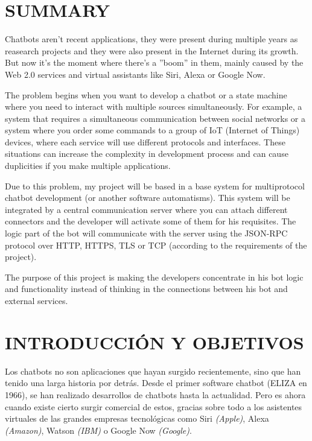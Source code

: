 \documentclass[spanish,12pt, a4paper, twoside]{paper}
\let\oldsection\section
\def\section{\cleardoublepage\oldsection}
\begin{document}
\section*{SUMMARY}
Chatbots aren't recent applications, they were present during multiple years as reasearch projects and they were also present in the Internet during its growth. But now it's the moment where there's a ''boom'' in them, mainly caused by the Web 2.0 services and virtual assistants like Siri, Alexa or Google Now.
\newline

The problem begins when you want to develop a chatbot or a state machine where you need to interact with multiple sources simultaneously. For example, a system that requires a simultaneous communication between social networks or a system where you order some commands to a group of IoT (Internet of Things) devices, where each service will use different protocols and interfaces. These situations can increase the complexity in development process and can cause duplicities if you make multiple applications. 
\newline

Due to this problem, my project will be based in a base system for multiprotocol chatbot development (or another software automatisms). This system will be integrated by a central communication server where you can attach different connectors and the developer will activate some of them for his requisites. The logic part of the bot will communicate with the server using the JSON-RPC protocol over HTTP, HTTPS, TLS or TCP (according to the requirements of the project).
\newline

The purpose of this project is making the developers concentrate in his bot logic and functionality instead of thinking in the connections between his bot and external services.

\tableofcontents %

\listoffigures
\listoftables

\newpage
{} 

\section{INTRODUCCIÓN Y OBJETIVOS}

Los chatbots no son aplicaciones que hayan surgido recientemente, sino que han tenido una larga historia por detrás. Desde el primer software chatbot (ELIZA en 1966), se han realizado desarrollos de chatbots hasta la actualidad. Pero es ahora cuando existe cierto surgir comercial de estos, gracias sobre todo a los asistentes virtuales de las grandes empresas tecnológicas como Siri \emph{(Apple)}, Alexa \emph{(Amazon)}, Watson \emph{(IBM)} o Google Now \emph{(Google)}.
\newline
\end{document}
